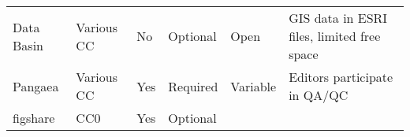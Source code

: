 \begin{longtable}[c]{@{}llllll@{}}
\begin{minipage}[t]{0.16\columnwidth}
Data Basin
\end{minipage} & \begin{minipage}[t]{0.09\columnwidth}\raggedright
Various CC
\end{minipage} & \begin{minipage}[t]{0.07\columnwidth}\raggedright
No
\end{minipage} & \begin{minipage}[t]{0.12\columnwidth}\raggedright
Optional
\end{minipage} & \begin{minipage}[t]{0.10\columnwidth}\raggedright
Open
\end{minipage} & \begin{minipage}[t]{0.15\columnwidth}\raggedright
GIS data in ESRI files, limited free space
\end{minipage}
\\\addlinespace
\begin{minipage}[t]{0.16\columnwidth}\raggedright
Pangaea
\end{minipage} & \begin{minipage}[t]{0.09\columnwidth}\raggedright
Various CC
\end{minipage} & \begin{minipage}[t]{0.07\columnwidth}\raggedright
Yes
\end{minipage} & \begin{minipage}[t]{0.12\columnwidth}\raggedright
Required
\end{minipage} & \begin{minipage}[t]{0.10\columnwidth}\raggedright
Variable
\end{minipage} & \begin{minipage}[t]{0.15\columnwidth}\raggedright
Editors participate in QA/QC
\end{minipage}
\\\addlinespace
\begin{minipage}[t]{0.16\columnwidth}\raggedright
figshare
\end{minipage} & \begin{minipage}[t]{0.09\columnwidth}\raggedright
CC0
\end{minipage} & \begin{minipage}[t]{0.07\columnwidth}\raggedright
Yes
\end{minipage} & \begin{minipage}[t]{0.12\columnwidth}\raggedright
Optional
\end{minipage} & \begin{minipage}[t]{0.10\columnwidth}\raggedright

\end{minipage}
\end{longtable}
